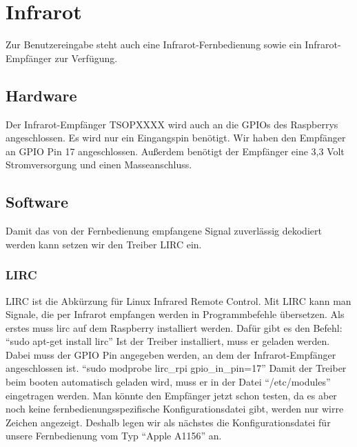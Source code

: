 \section{Infrarot}
Zur Benutzereingabe steht auch eine Infrarot-Fernbedienung sowie ein Infrarot-Empfänger zur Verfügung. 

\subsection{Hardware}
Der Infrarot-Empfänger TSOPXXXX wird auch an die GPIOs des Raspberrys angeschlossen. 
\newline
Es wird nur ein Eingangspin benötigt. Wir haben den Empfänger an GPIO Pin 17 angeschlossen. Außerdem benötigt der Empfänger eine 3,3 Volt Stromversorgung und einen Masseanschluss. 

\subsection{Software}
Damit das von der Fernbedienung empfangene Signal zuverlässig dekodiert werden kann setzen wir den Treiber LIRC ein.
\subsubsection{LIRC}
LIRC ist die Abkürzung für Linux Infrared Remote Control. Mit LIRC kann man Signale, die per Infrarot empfangen werden in Programmbefehle übersetzen.
\newline
Als erstes muss lirc auf dem Raspberry installiert werden. Dafür gibt es den Befehl:
\newline
"`sudo apt-get install lirc"'
\newline
Ist der Treiber installiert, muss er geladen werden. Dabei muss der GPIO Pin angegeben werden, an dem der Infrarot-Empfänger angeschlossen ist.
\newline
"`sudo modprobe lirc\_rpi gpio\_in\_pin=17"'
\newline
Damit der Treiber beim booten automatisch geladen wird, muss er in der Datei "`/etc/modules"' eingetragen werden.
\newline
\newline
Man könnte den Empfänger jetzt schon testen, da es aber noch keine fernbedienungsspezifische Konfigurationsdatei gibt, werden nur wirre Zeichen angezeigt.
Deshalb legen wir als nächstes die Konfigurationsdatei für unsere Fernbedienung vom Typ "`Apple A1156"' an.


